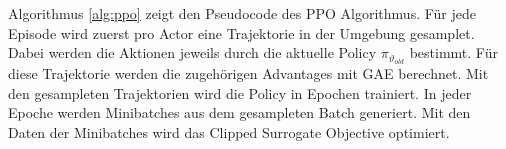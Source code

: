 Algorithmus \ref{alg:ppo} zeigt den Pseudocode des PPO Algorithmus. Für jede Episode wird zuerst pro Actor eine Trajektorie in der Umgebung gesamplet. Dabei werden die Aktionen jeweils durch die aktuelle Policy $\pi_{\vartheta_{old}}$ bestimmt. Für diese Trajektorie werden die zugehörigen Advantages mit GAE berechnet. 
Mit den gesampleten Trajektorien wird die Policy in Epochen trainiert. In jeder Epoche werden Minibatches aus dem gesampleten Batch generiert. Mit den Daten der Minibatches wird das Clipped Surrogate Objective optimiert.